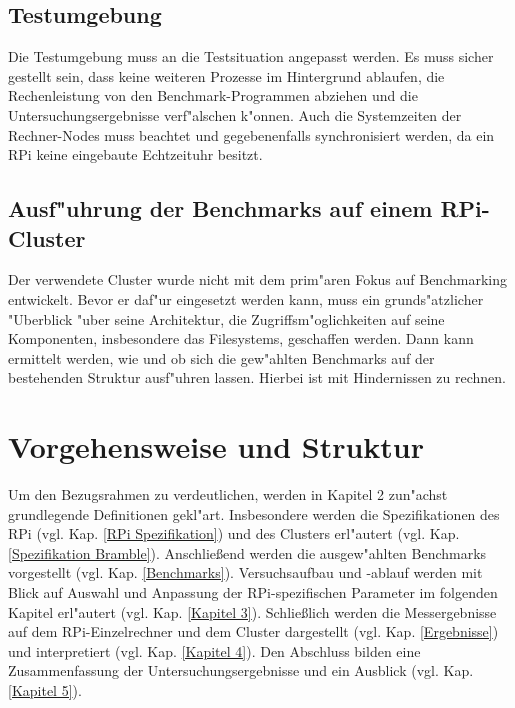 \subsection{Testumgebung}\label{Testumgebung}

Die Testumgebung muss an die Testsituation angepasst werden. Es muss sicher gestellt sein, dass keine weiteren Prozesse im Hintergrund ablaufen, die Rechenleistung von den Benchmark-Programmen abziehen und die Untersuchungsergebnisse verf"alschen k"onnen. Auch die Systemzeiten der Rechner-Nodes muss beachtet und gegebenenfalls synchronisiert werden, da ein RPi keine eingebaute Echtzeituhr besitzt. 

\subsection{Ausf"uhrung der Benchmarks auf einem RPi-Cluster}\label{Anpassung Cluster}

Der verwendete Cluster wurde nicht mit dem prim"aren Fokus auf Benchmarking entwickelt. Bevor er daf"ur eingesetzt werden kann, muss ein grunds"atzlicher "Uberblick "uber seine Architektur, die Zugriffsm"oglichkeiten auf seine Komponenten, insbesondere das Filesystems, geschaffen werden. Dann kann ermittelt werden, wie und ob sich die gew"ahlten Benchmarks auf der bestehenden Struktur ausf"uhren lassen. Hierbei ist mit Hindernissen zu rechnen. 
\newpage
\section{Vorgehensweise und Struktur}\label{Struktur}

Um den Bezugsrahmen zu verdeutlichen, werden in Kapitel 2 zun"achst grundlegende Definitionen gekl"art. Insbesondere werden die Spezifikationen des RPi (vgl. Kap. \ref{RPi Spezifikation}) und des Clusters erl"autert (vgl. Kap. \ref{Spezifikation Bramble}). Anschlie\ss end werden die ausgew"ahlten Benchmarks vorgestellt (vgl. Kap. \ref{Benchmarks}). Versuchsaufbau und -ablauf werden mit Blick auf Auswahl und Anpassung der RPi-spezifischen Parameter im folgenden Kapitel erl"autert (vgl. Kap. \ref{Kapitel 3}). Schlie\ss lich  werden die Messergebnisse auf dem RPi-Einzelrechner und dem Cluster dargestellt (vgl. Kap. \ref{Ergebnisse}) und interpretiert (vgl. Kap. \ref{Kapitel 4}). Den Abschluss bilden eine Zusammenfassung der Untersuchungsergebnisse und ein Ausblick (vgl. Kap. \ref{Kapitel 5}).

\endinput 
